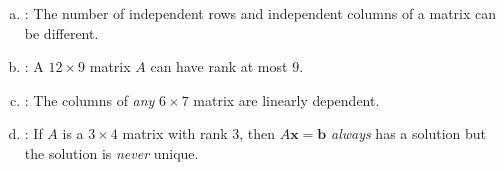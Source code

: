 \documentclass[12pt,letterpaper]{exam}
\begin{document}
\begin{questions}
\begin{enumerate}[(a)]
\item \underline{\itshape\hspace{0.65cm}\hspace{0.65cm}}: The number of independent rows and independent columns of a matrix can be different. \vfill %

\item \underline{\itshape\hspace{0.6cm}\hspace{0.6cm}}: A $12 \times 9$ matrix $A$ can have rank at most $9$. \vfill %

\item \underline{\itshape\hspace{0.6cm}\hspace{0.6cm}}: The columns of \textit{any} $6 \times 7$ matrix are linearly dependent. \vfill %

\item \underline{\itshape\hspace{0.6cm}\hspace{0.6cm}}: If $A$ is a $3 \times 4$ matrix with rank 3, then $A\mathbf{x}= \mathbf{b}$ \textit{always} has a solution but the solution is \textit{never} unique. \par\vspace{1cm} %
\end{enumerate}

\end{questions}
\end{document}
